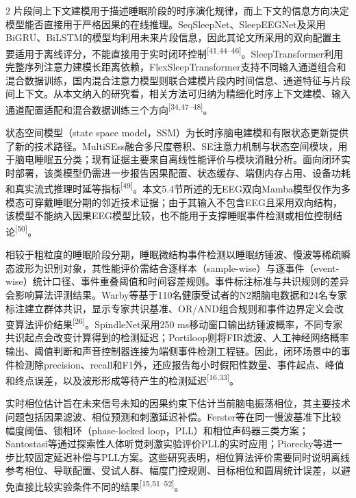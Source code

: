 \documentclass[UTF8,zihao=5,fontset=none]{ctexart}
\newcommand{\hei}{\CJKfamily{hei}}
\newcommand{\levelthree}[1]{%
  \par\noindent{\hei\fontsize{10pt}{12pt}\selectfont\bfseries #1}}
\newcommand{\refcite}[1]{\nolinebreak[4]\textsuperscript{[#1]}}
\begin{document}
\begin{multicols}{2}
片段间上下文建模用于描述睡眠阶段的时序演化规律，而上下文的信息方向决定模型能否直接用于严格因果的在线推理。SeqSleepNet、SleepEEGNet及采用BiGRU、BiLSTM的模型均利用未来片段信息，因此其论文所采用的双向配置主要适用于离线评分，不能直接用于实时闭环控制\refcite{41,44--46}。SleepTransformer利用完整序列注意力建模长距离依赖，FlexSleepTransformer支持不同输入通道组合和混合数据训练，国内混合注意力模型则联合建模片段内时间信息、通道特征与片段间上下文。从本文纳入的研究看，相关方法可归纳为精细化时序上下文建模、输入通道配置适配和混合数据训练三个方向\refcite{34,47--48}。\par

状态空间模型（state space model，SSM）为长时序脑电建模和有限状态更新提供了新的技术路径。MultiSEss融合多尺度卷积、SE注意力机制与状态空间模块，用于脑电睡眠五分类；现有证据主要来自离线性能评价与模块消融分析。面向闭环实时部署，该类模型仍需进一步报告因果配置、状态缓存、端侧内存占用、设备功耗和真实流式推理时延等指标\refcite{49}。本文5.4节所述的无EEG双向Mamba模型仅作为多模态可穿戴睡眠分期的邻近技术证据；由于其输入不包含EEG且采用双向结构，该模型不能纳入因果EEG模型比较，也不能用于支撑睡眠事件检测或相位控制结论\refcite{50}。\par

\levelthree{2.2.4 事件检测与相位预测算法}
相较于粗粒度的睡眠阶段分期，睡眠微结构事件检测以睡眠纺锤波、慢波等稀疏瞬态波形为识别对象，其性能评价需结合逐样本（sample-wise）与逐事件（event-wise）统计口径、事件重叠阈值和时间容差规则。事件标注标准与共识规则的差异会影响算法评测结果。Warby等基于110名健康受试者的N2期脑电数据和24名专家标注建立群体共识，显示专家共识基准、OR/AND组合规则和事件边界定义会改变算法评价结果\refcite{26}。SpindleNet采用250 ms移动窗口输出纺锤波概率，不同专家共识起点会改变计算得到的检测延迟；Portiloop则将FIR滤波、人工神经网络概率输出、阈值判断和声音控制器连接为端侧事件检测工程链。因此，闭环场景中的事件检测除precision、recall和F1外，还应报告每小时假阳性数量、事件起点、峰值和终点误差，以及波形形成等待产生的检测延迟\refcite{16,33}。\par

实时相位估计旨在未来信号未知的因果约束下估计当前脑电振荡相位，其主要技术问题包括因果滤波、相位预测和刺激延迟补偿。Ferster等在同一慢波基准下比较幅度阈值、锁相环（phase-locked loop，PLL）和相位声码器三类方案；Santostasi等通过探索性人体听觉刺激实验评价PLL的实时应用；Piorecky等进一步比较固定延迟补偿与PLL方案。这些研究表明，相位算法评价需要同时说明离线参考相位、导联配置、受试人群、幅度门控规则、目标相位和圆周统计误差，以避免直接比较实验条件不同的结果\refcite{15,51--52}。\par


\end{multicols}
\end{document}
